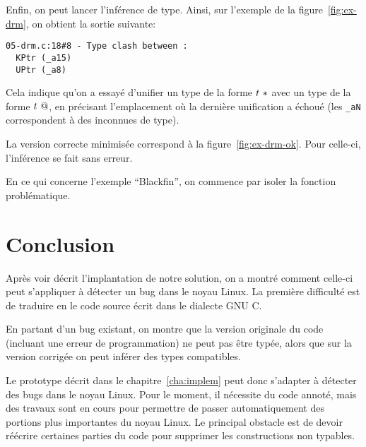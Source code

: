 Enfin, on peut lancer l'inférence de type. Ainsi, sur l'exemple de la
figure~\ref{fig:ex-drm}, on obtient la sortie suivante:

\begin{Verbatim}
05-drm.c:18#8 - Type clash between :
  KPtr (_a15)
  UPtr (_a8)
\end{Verbatim}

Cela indique qu'on a essayé d'unifier un type de la forme $t~*$ avec un
type de la forme $t~@$, en précisant l'emplacement où la dernière
unification a échoué (les \texttt{\_aN} correspondent à des inconnues de type).

La version correcte minimisée correspond à la figure~\ref{fig:ex-drm-ok}. Pour
celle-ci, l'inférence se fait sans erreur.


En ce qui concerne l'exemple \enquote{Blackfin}, on commence par isoler la
fonction problématique.


\section*{Conclusion}

Après voir décrit l'implantation de notre solution, on a montré comment celle-ci
peut s'appliquer à détecter un bug dans le noyau Linux. La première difficulté
est de traduire en \newspeak le code source écrit dans le dialecte GNU C.

En partant d'un bug existant, on montre que la version originale du code
(incluant une erreur de programmation) ne peut pas être typée, alors que sur la
version corrigée on peut inférer des types compatibles.

Le prototype décrit dans le chapitre~\ref{cha:implem} peut donc s'adapter à
détecter des bugs dans le noyau Linux. Pour le moment, il nécessite du code
annoté, mais des travaux sont en cours pour permettre de passer automatiquement
des portions plus importantes du noyau Linux. Le principal obstacle est de
devoir réécrire certaines parties du code pour supprimer les constructions non
typables.


